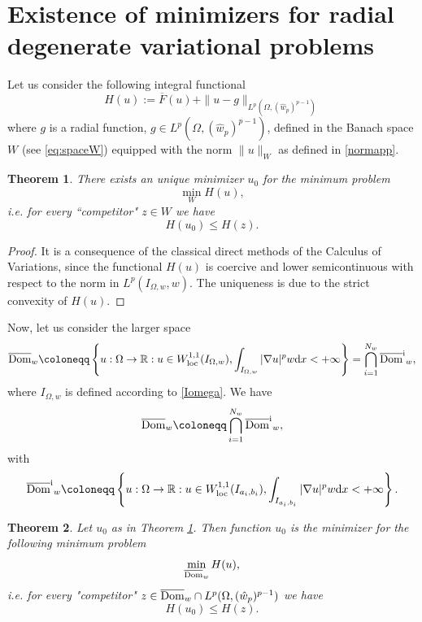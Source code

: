 \documentclass[11pt,leqno]{amsart}
\newtheorem{teo}{Theorem}[section]
\theoremstyle{remark}
\theoremstyle{definition}
\theoremstyle{definition}
\newcommand{\wstar}{{\hat w}}
\newcommand{\bbR}{{\mathbb{R}}}
\newcommand{\R}{\bbR}
\def\de{{\rm d}}
\begin{document}
\section{Existence of minimizers for radial degenerate variational problems}\label{sec:minimizer}
Let us consider the following integral functional
$$
H(u):=\overline{F}(u)+\|u-g\|_{L^{p}(\Omega,(\wstar_{p})^{p-1})}
$$
where $g$ is a radial function, $g\in L^{p}(\Omega,(\wstar_{p})^{p-1})$, defined in the Banach space
$
W$
(see \eqref{eq:spaceW}) equipped 
with the norm
$\|u\|_W$
as defined in \eqref{normapp}.
\begin{teo}\label{exist} There exists an unique minimizer $u_0$ for the minimum problem
$$
\min_W H(u),
$$
i.e. for every ``competitor" $z\in W$ we have
$$
H(u_0)\leq H(z).
$$
\end{teo}
\begin{proof} It is a consequence of the classical direct methods of the Calculus of Variations, since the functional $H(u)$ is coercive and lower semicontinuous with respect to the norm in $L^{p}(I_{\Omega,w},w)$. The uniqueness is due to the strict convexity of $H(u)$.
\end{proof}
Now, let us consider the larger space
\begin{align*}
{\rm{\overline{Dom}}}_{w}\coloneqq \left\{u: \Omega\rightarrow \R: u\in W_{{\rm loc}}^{1,1}(I_{\Omega,w}), \displaystyle\int_{I_{\Omega,w}}\vert \nabla u\vert^{p}w\de x<+\infty\right\}=\bigcap_{i=1}^{N_w}{\rm{\overline{Dom}^i}}_{w},
\end{align*}
where $I_{\Omega,w}$ is defined according to \eqref{Iomega}. We have
$$
{\rm{\overline{Dom}}}_{w}\coloneqq\bigcap_{i=1}^{N_w}{\rm{\overline{Dom}^i}}_{w},
$$
with
\begin{align*}
{\rm{\overline{Dom}^i}}_{w}\coloneqq \left\{u: \Omega\rightarrow \R: u\in W_{{\rm loc}}^{1,1}(I_{a_{i},b_{i}}),\displaystyle\int_{I_{a_{i},b_{i}}}\vert \nabla u\vert^{p}w\de x<+\infty\right\}.
\end{align*}
\begin{teo}\label{thm:minimizer}
Let $u_0$ as in Theorem \ref{exist}. Then function $u_0$ is the minimizer for the following minimum problem
$$
\min_{{\rm{\overline{Dom}}}_{w}} H(u),
$$
i.e. for every "competitor" $z\in {\rm{\overline{Dom}}}_{w}\cap L^{p}(\Omega,(\wstar_{p})^{p-1})$ we have
$$
H(u_0)\leq H(z).
$$
\end{teo}
\end{document}
